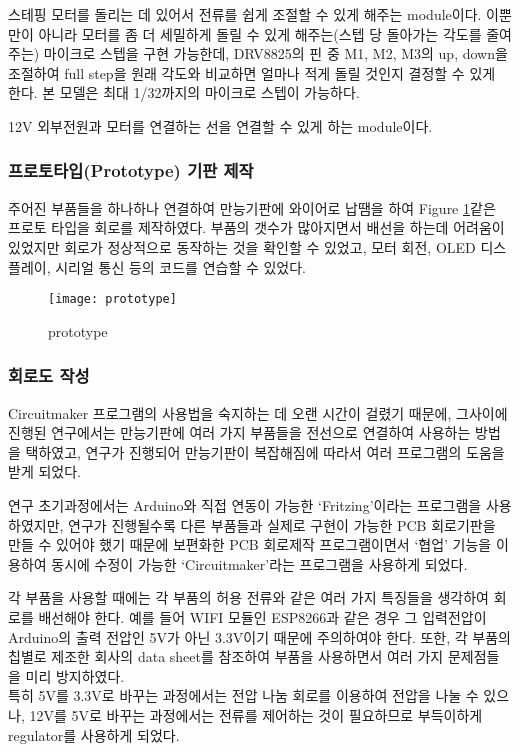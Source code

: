 \begin{description}[font=$\bullet$~\normalfont\scshape\color{red!50!black}]
	\item [TMC2100 (DRV8825)] 스테핑 모터를 돌리는 데 있어서 전류를 쉽게 조절할 수 있게 해주는 module이다. 이뿐만이 아니라 모터를 좀 더 세밀하게 돌릴 수 있게 해주는(스텝 당 돌아가는 각도를 줄여주는) 마이크로 스텝을 구현 가능한데, DRV8825의 핀 중 M1, M2, M3의 up, down을 조절하여 full step을 원래 각도와 비교하면 얼마나 적게 돌릴 것인지 결정할 수 있게 한다. 본 모델은 최대 1/32까지의 마이크로 스텝이 가능하다.
	\item [TE Connectivity/AMP 5525258-3 및 Wurth Elektronik 694106301002] 12V 외부전원과 모터를 연결하는 선을 연결할 수 있게 하는 module이다.
\end{description}

\subsubsection{프로토타입(Prototype) 기판 제작}

주어진 부품들을 하나하나 연결하여 만능기판에 와이어로 납땜을 하여 Figure \ref{fig:prototype}\과 같은 프로토 타입을 회로를 제작하였다. 부품의 갯수가 많아지면서 배선을 하는데 어려움이 있었지만 회로가 정상적으로 동작하는 것을 확인할 수 있었고, 모터 회전, OLED 디스플레이, 시리얼 통신 등의 코드를 연습할 수 있었다.

\begin{figure}[h]
	\begin{center}
		\texttt{[image: prototype]} 
		\caption{prototype}
		\label{fig:prototype}
	\end{center}
\end{figure}


\subsubsection{회로도 작성}

Circuitmaker 프로그램의 사용법을 숙지하는 데 오랜 시간이 걸렸기 때문에, 그사이에 진행된 연구에서는 만능기판에 여러 가지 부품들을 전선으로 연결하여 사용하는 방법을 택하였고, 연구가 진행되어 만능기판이 복잡해짐에 따라서 여러 프로그램의 도움을 받게 되었다.

연구 초기과정에서는 Arduino와 직접 연동이 가능한 ‘Fritzing’이라는 프로그램을 사용하였지만, 연구가 진행될수록 다른 부품들과 실제로 구현이 가능한 PCB 회로기판을 만들 수 있어야 했기 때문에 보편화한 PCB 회로제작 프로그램이면서 ‘협업’ 기능을 이용하여 동시에 수정이 가능한 ‘Circuitmaker’라는 프로그램을 사용하게 되었다.

각 부품을 사용할 때에는 각 부품의 허용 전류와 같은 여러 가지 특징들을 생각하여 회로를 배선해야 한다. 예를 들어 WIFI 모듈인 ESP8266과 같은 경우 그 입력전압이 Arduino의 출력 전압인 5V가 아닌 3.3V이기 때문에 주의하여야 한다. 또한, 각 부품의 칩별로 제조한 회사의 data sheet를 참조하여 부품을 사용하면서 여러 가지 문제점들을 미리 방지하였다.\\
특히 5V를 3.3V로 바꾸는 과정에서는 전압 나눔 회로를 이용하여 전압을 나눌 수 있으나, 12V를 5V로 바꾸는 과정에서는 전류를 제어하는 것이 필요하므로 부득이하게 regulator를 사용하게 되었다.


